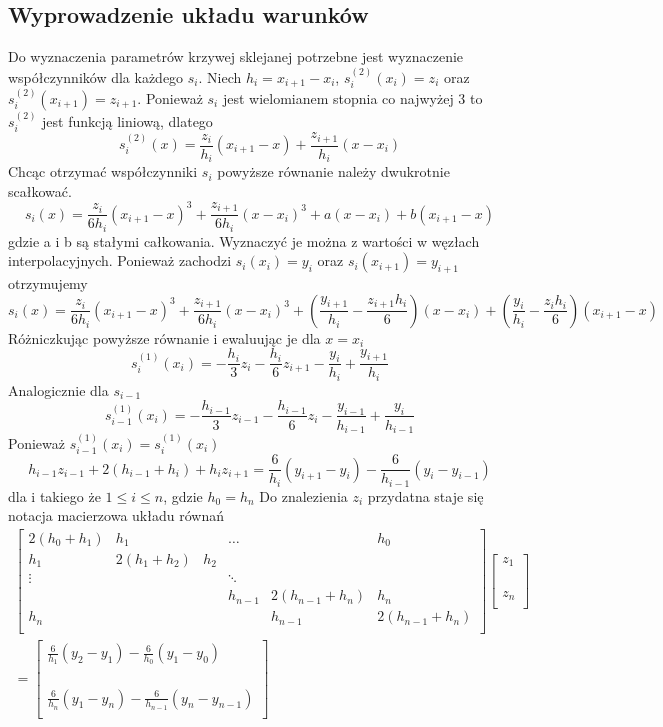 \documentclass[11pt,wide]{article}
\begin{document}
\subsection{Wyprowadzenie układu warunków}
Do wyznaczenia parametrów krzywej sklejanej potrzebne jest wyznaczenie współczynników dla każdego $s_i$. Niech $h_i = x_{i+1}-x_i$, $s_i^{(2)}(x_i)=z_i$ oraz $s_{i}^{(2)}(x_{i+1})=z_{i+1}$. Ponieważ $s_i$ jest wielomianem stopnia co najwyżej 3 to $s_i^{(2)}$ jest funkcją liniową, dlatego
$$s_i^{(2)}(x) = \frac{z_i}{h_i}(x_{i+1}-x)+\frac{z_{i+1}}{h_i}(x-x_i)$$
Chcąc otrzymać współczynniki $s_i$ powyższe równanie należy dwukrotnie scałkować.
$$s_i(x) = \frac{z_i}{6h_i}(x_{i+1}-x)^3+\frac{z_{i+1}}{6h_i}(x-x_i)^3+a(x-x_i)+b(x_{i+1}-x)$$
gdzie a i b są stałymi całkowania. Wyznaczyć je można z wartości w węzłach interpolacyjnych. Ponieważ zachodzi $s_i(x_i)=y_i$ oraz $s_i(x_{i+1})=y_{i+1}$ otrzymujemy
$$s_i(x)=\frac{z_i}{6h_i}(x_{i+1}-x)^3+\frac{z_{i+1}}{6h_i}(x-x_i)^3+(\frac{y_{i+1}}{h_i}-\frac{z_{i+1}h_i}{6})(x-x_i)+(\frac{y_{i}}{h_i}-\frac{z_{i}h_i}{6})(x_{i+1}-x)$$
Różniczkując powyższe równanie i ewaluując je dla $x=x_i$
$$s_i^{(1)}(x_i)=-\frac{h_i}{3}z_i-\frac{h_i}{6}z_{i+1}-\frac{y_i}{h_i}+\frac{y_{i+1}}{h_i}$$
Analogicznie dla $s_{i-1}$
$$s_{i-1}^{(1)}(x_i)=-\frac{h_{i-1}}{3}z_{i-1}-\frac{h_{i-1}}{6}z_{i}-\frac{y_{i-1}}{h_{i-1}}+\frac{y_{i}}{h_{i-1}}$$
Ponieważ $s_{i-1}^{(1)}(x_i)=s_{i}^{(1)}(x_i)$
$$h_{i-1}z_{i-1}+2(h_{i-1}+h_i)+h_iz_{i+1}=\frac{6}{h_i}(y_{i+1}-y_i)-\frac{6}{h_{i-1}}(y_i-y_{i-1})$$  dla i takiego że $1\leq i\leq n$, gdzie $h_0=h_n$
Do znalezienia $z_i$ przydatna staje się notacja macierzowa układu równań
\begin{equation}
\begin{split}
\begin{bmatrix}
    2(h_0+h_1) & h_1 & &\dots& & h_0\\
    h_1 & 2(h_1+h_2) & h_2&&& \\
    \vdots& && \ddots && \\
    & &&h_{n-1} &2(h_{n-1}+h_n) & h_n\\
    h_n& & &&h_{n-1} & 2(h_{n-1}+h_{n}) \\
\end{bmatrix}
\begin{bmatrix}
z_1\\
\\
\\
\\
z_n\\
\end{bmatrix}
\\=
\begin{bmatrix}
\frac{6}{h_1}(y_2-y_1)-\frac{6}{h_0}(y_1-y_0)\\
\\
\\
\\
\frac{6}{h_n}(y_1-y_n)-\frac{6}{h_{n-1}}(y_n-y_{n-1})\\
\end{bmatrix}
\end{split}
\end{equation}
\end{document}
